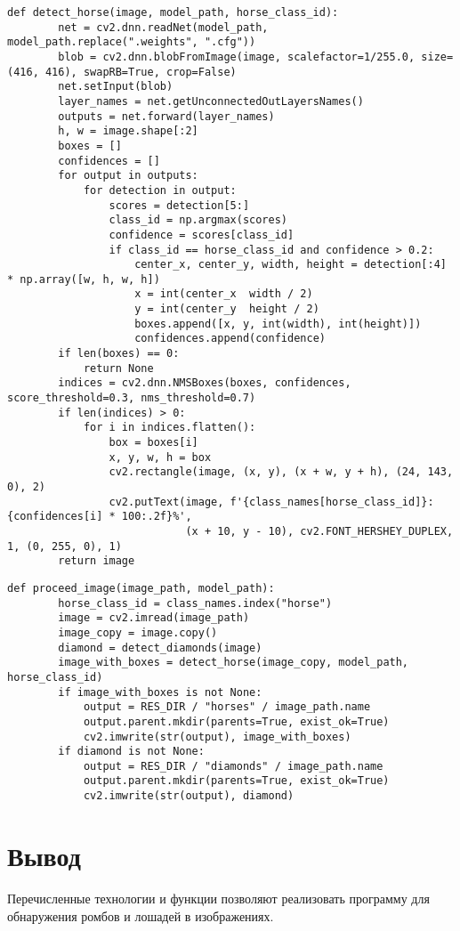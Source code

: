 \begin{lstlisting}[caption={Определение лошади}]
    def detect_horse(image, model_path, horse_class_id):
        net = cv2.dnn.readNet(model_path, model_path.replace(".weights", ".cfg"))
        blob = cv2.dnn.blobFromImage(image, scalefactor=1/255.0, size=(416, 416), swapRB=True, crop=False)
        net.setInput(blob)
        layer_names = net.getUnconnectedOutLayersNames()
        outputs = net.forward(layer_names)
        h, w = image.shape[:2]
        boxes = []
        confidences = []
        for output in outputs:
            for detection in output:
                scores = detection[5:]
                class_id = np.argmax(scores)
                confidence = scores[class_id]
                if class_id == horse_class_id and confidence > 0.2:
                    center_x, center_y, width, height = detection[:4] * np.array([w, h, w, h])
                    x = int(center_x  width / 2)
                    y = int(center_y  height / 2)
                    boxes.append([x, y, int(width), int(height)])
                    confidences.append(confidence)
        if len(boxes) == 0:
            return None
        indices = cv2.dnn.NMSBoxes(boxes, confidences, score_threshold=0.3, nms_threshold=0.7)
        if len(indices) > 0:
            for i in indices.flatten():
                box = boxes[i]
                x, y, w, h = box
                cv2.rectangle(image, (x, y), (x + w, y + h), (24, 143, 0), 2)
                cv2.putText(image, f'{class_names[horse_class_id]}: {confidences[i] * 100:.2f}%',
                            (x + 10, y - 10), cv2.FONT_HERSHEY_DUPLEX, 1, (0, 255, 0), 1)
        return image
\end{lstlisting}

\begin{lstlisting}[caption={Обработка изображения}]
    def proceed_image(image_path, model_path):
        horse_class_id = class_names.index("horse")
        image = cv2.imread(image_path)
        image_copy = image.copy()
        diamond = detect_diamonds(image)
        image_with_boxes = detect_horse(image_copy, model_path, horse_class_id)
        if image_with_boxes is not None:
            output = RES_DIR / "horses" / image_path.name
            output.parent.mkdir(parents=True, exist_ok=True)
            cv2.imwrite(str(output), image_with_boxes)
        if diamond is not None:
            output = RES_DIR / "diamonds" / image_path.name
            output.parent.mkdir(parents=True, exist_ok=True)
            cv2.imwrite(str(output), diamond)
\end{lstlisting}

\section*{Вывод}

Перечисленные технологии и функции позволяют реализовать программу для обнаружения ромбов и лошадей в изображениях.

\clearpage
